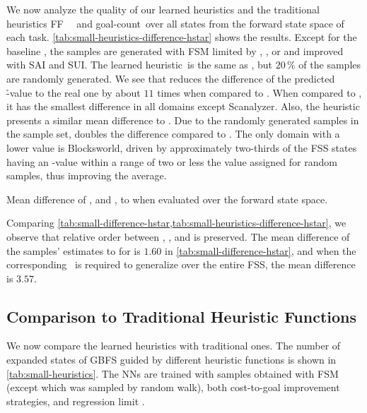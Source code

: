 We now analyze the quality of our learned heuristics and the traditional heuristics FF~\hff~\cite{hoffmann2001ff} and goal-count~\hgc over all states from the forward state space of each task. \cref{tab:small-heuristics-difference-hstar} shows the results. Except for the baseline \hnnbase, the samples are generated with FSM limited by \rldefault, \rlfacts, or \rlmeanfx and improved with SAI and SUI. The learned heuristic~\hnnrs is the same as \hnnl{\rlmeanfx}, but $20\,\%$ of the samples are randomly generated. We see that \hnnl{\rlmeanfx} reduces the difference of the predicted \h-value to the real one by about $11$ times when compared to \hnnbase. When compared to \hgc, it has the smallest difference in all domains except Scanalyzer. Also, the heuristic \hnnl{\rlmeanfx} presents a similar mean difference to \hff. Due to the randomly generated samples in the sample set, \hnnrs doubles the difference compared to \hnnl{\rlmeanfx}. The only domain with a lower value is Blocksworld, driven by approximately two-thirds of the FSS states having an \hstar-value within a range of two or less the value assigned for random samples, thus improving the average.

\begin{table}[tb]
    \caption[Mean difference of heuristics to \hstar when evaluated over the FSS.]{Mean difference of \hff, \hgc and \hnn, to \hstar when evaluated over the forward state space.}
    \label{tab:small-heuristics-difference-hstar}
    \addmargin
    \centering
    
\end{table}

Comparing \cref{tab:small-difference-hstar,tab:small-heuristics-difference-hstar}, we observe that relative order between \rldefault, \rlfacts, and \rlmeanfx is preserved. The mean difference of the samples' estimates to \hstar for \rlmeanfx is $1.60$ in \cref{tab:small-difference-hstar}, and when the corresponding~\hnnl{\rlmeanfx} is required to generalize over the entire FSS, the mean difference is $3.57$.

\subsection{Comparison to Traditional Heuristic Functions}
\label{sec:small-exps-hvalue-comparison}

We now compare the learned heuristics with traditional ones. The number of expanded states of GBFS guided by different heuristic functions is shown in \cref{tab:small-heuristics}. The NNs are trained with samples obtained with FSM (except \hnnrwrs which was sampled by random walk), both cost-to-goal improvement strategies, and regression limit \meanfx.  

